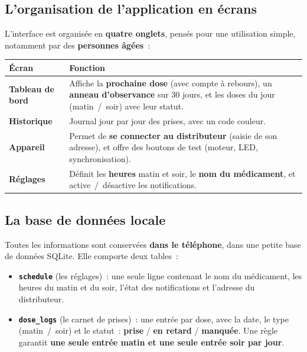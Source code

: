 \documentclass[11pt,a4paper]{report}
\begin{document}
\subsection{L'organisation de l'application en \'ecrans}

L'interface est organis\'ee en \textbf{quatre onglets}, pens\'es pour une utilisation simple,
notamment par des \textbf{personnes \^ag\'ees}~:

\begin{tabularx}{\linewidth}{L{2.8cm} X}
\toprule
{}\textbf{\'Ecran} & \textbf{Fonction} \\
\midrule
\textbf{Tableau de bord} & Affiche la \textbf{prochaine dose} (avec compte \`a rebours), un \textbf{anneau d'observance} sur 30 jours, et les doses du jour (matin~/~soir) avec leur statut. \\
\textbf{Historique} & Journal jour par jour des prises, avec un code couleur. \\
\textbf{Appareil} & Permet de \textbf{se connecter au distributeur} (saisie de son adresse), et offre des boutons de test (moteur, LED, synchronisation). \\
\textbf{R\'eglages} & D\'efinit les \textbf{heures} matin et soir, le \textbf{nom du m\'edicament}, et active~/~d\'esactive les notifications. \\
\bottomrule
\end{tabularx}

\subsection{La base de donn\'ees locale}

Toutes les informations sont conserv\'ees \textbf{dans le t\'el\'ephone}, dans une petite
base de donn\'ees SQLite. Elle comporte deux tables~:

\begin{itemize}
  \item \textbf{\texttt{schedule}} (les r\'eglages)~: une seule ligne contenant le nom du
        m\'edicament, les heures du matin et du soir, l'\'etat des notifications et
        l'adresse du distributeur.
  \item \textbf{\texttt{dose\_logs}} (le carnet de prises)~: une entr\'ee par dose, avec la
        date, le type (matin~/~soir) et le statut~:
        {\color{taken}\textbf{prise}} / {\color{late}\textbf{en retard}} /
        {\color{missed}\textbf{manqu\'ee}}. Une r\`egle garantit \textbf{une seule entr\'ee
        matin et une seule entr\'ee soir par jour}.
\end{itemize}
\end{document}
